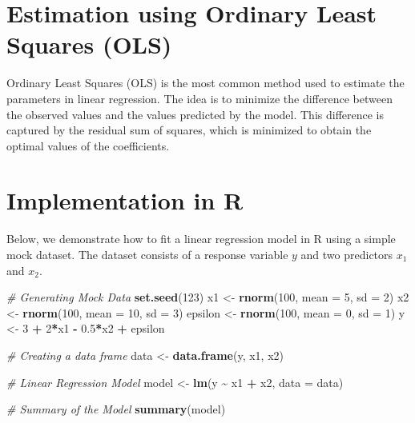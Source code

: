 \documentclass[
  12 pt,
  a4paper,
]{book}
\newenvironment{Shaded}{\begin{snugshade}}{\end{snugshade}}
\newcommand{\AttributeTok}[1]{\textcolor[rgb]{0.13,0.29,0.53}{#1}}
\newcommand{\CommentTok}[1]{\textcolor[rgb]{0.56,0.35,0.01}{\textit{#1}}}
\newcommand{\DecValTok}[1]{\textcolor[rgb]{0.00,0.00,0.81}{#1}}
\newcommand{\FloatTok}[1]{\textcolor[rgb]{0.00,0.00,0.81}{#1}}
\newcommand{\FunctionTok}[1]{\textcolor[rgb]{0.13,0.29,0.53}{\textbf{#1}}}
\newcommand{\NormalTok}[1]{#1}
\newcommand{\OtherTok}[1]{\textcolor[rgb]{0.56,0.35,0.01}{#1}}
\newcommand{\SpecialCharTok}[1]{\textcolor[rgb]{0.81,0.36,0.00}{\textbf{#1}}}
\numberwithin{equation}{section}
\theoremstyle{plain}      %
\theoremstyle{definition} %
\theoremstyle{remark}     %
\theoremstyle{note}         %
\begin{document}
\hypertarget{estimation-using-ordinary-least-squares-ols}{%
\section{Estimation using Ordinary Least Squares
(OLS)}\label{estimation-using-ordinary-least-squares-ols}}

Ordinary Least Squares (OLS) is the most common method used to estimate
the parameters in linear regression. The idea is to minimize the
difference between the observed values and the values predicted by the
model. This difference is captured by the residual sum of squares, which
is minimized to obtain the optimal values of the coefficients.

\hypertarget{implementation-in-r-1}{%
\section{Implementation in R}\label{implementation-in-r-1}}

Below, we demonstrate how to fit a linear regression model in R using a
simple mock dataset. The dataset consists of a response variable \(y\)
and two predictors \(x_1\) and \(x_2\).

\scriptsize

\begin{Shaded}
\begin{Highlighting}[]
\CommentTok{\# Generating Mock Data}
\FunctionTok{set.seed}\NormalTok{(}\DecValTok{123}\NormalTok{)}
\NormalTok{x1 }\OtherTok{\textless{}{-}} \FunctionTok{rnorm}\NormalTok{(}\DecValTok{100}\NormalTok{, }\AttributeTok{mean =} \DecValTok{5}\NormalTok{, }\AttributeTok{sd =} \DecValTok{2}\NormalTok{)}
\NormalTok{x2 }\OtherTok{\textless{}{-}} \FunctionTok{rnorm}\NormalTok{(}\DecValTok{100}\NormalTok{, }\AttributeTok{mean =} \DecValTok{10}\NormalTok{, }\AttributeTok{sd =} \DecValTok{3}\NormalTok{)}
\NormalTok{epsilon }\OtherTok{\textless{}{-}} \FunctionTok{rnorm}\NormalTok{(}\DecValTok{100}\NormalTok{, }\AttributeTok{mean =} \DecValTok{0}\NormalTok{, }\AttributeTok{sd =} \DecValTok{1}\NormalTok{)}
\NormalTok{y }\OtherTok{\textless{}{-}} \DecValTok{3} \SpecialCharTok{+} \DecValTok{2}\SpecialCharTok{*}\NormalTok{x1 }\SpecialCharTok{{-}} \FloatTok{0.5}\SpecialCharTok{*}\NormalTok{x2 }\SpecialCharTok{+}\NormalTok{ epsilon}

\CommentTok{\# Creating a data frame}
\NormalTok{data }\OtherTok{\textless{}{-}} \FunctionTok{data.frame}\NormalTok{(y, x1, x2)}

\CommentTok{\# Linear Regression Model}
\NormalTok{model }\OtherTok{\textless{}{-}} \FunctionTok{lm}\NormalTok{(y }\SpecialCharTok{\textasciitilde{}}\NormalTok{ x1 }\SpecialCharTok{+}\NormalTok{ x2, }\AttributeTok{data =}\NormalTok{ data)}

\CommentTok{\# Summary of the Model}
\FunctionTok{summary}\NormalTok{(model)}
\end{Highlighting}
\end{Shaded}
\end{document}

